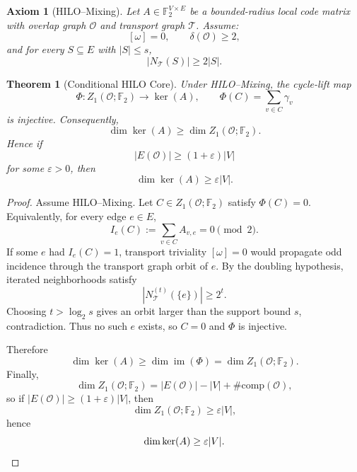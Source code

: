 \documentclass[11pt]{article}
\newtheorem{theorem}{Theorem}
\newtheorem{axiom}{Axiom}
\begin{document}
\begin{axiom}[HILO--Mixing]
Let $A\in\mathbb F_2^{V\times E}$ be a bounded-radius local code matrix with overlap graph $\mathcal O$
and transport graph $\mathcal T$.
Assume:
\[
[\omega]=0,\qquad \delta(\mathcal O)\ge 2,
\]
and for every $S\subseteq E$ with $|S|\le s$,
\[
|N_{\mathcal T}(S)|\ge 2|S|.
\]
\end{axiom}

\begin{theorem}[Conditional HILO Core]
Under HILO--Mixing, the cycle-lift map
\[
\Phi: Z_1(\mathcal O;\mathbb F_2)\to \ker(A),\qquad
\Phi(C)=\sum_{v\in C}\gamma_v
\]
is injective. Consequently,
\[
\dim \ker(A)\ge \dim Z_1(\mathcal O;\mathbb F_2).
\]
Hence if
\[
|E(\mathcal O)|\ge (1+\varepsilon)|V|
\]
for some $\varepsilon>0$, then
\[
\dim\ker(A)\ge \varepsilon |V|.
\]
\end{theorem}

\begin{proof}
Assume HILO--Mixing. Let $C\in Z_1(\mathcal O;\mathbb F_2)$ satisfy $\Phi(C)=0$.
Equivalently, for every edge $e\in E$,
\[
I_e(C):=\sum_{v\in C}A_{v,e}=0 \pmod 2.
\]
If some $e$ had $I_e(C)=1$, transport triviality $[\omega]=0$ would propagate odd incidence
through the transport graph orbit of $e$. By the doubling hypothesis, iterated neighborhoods satisfy
\[
|N_{\mathcal T}^{(t)}(\{e\})|\ge 2^t.
\]
Choosing $t>\log_2 s$ gives an orbit larger than the support bound $s$, contradiction.
Thus no such $e$ exists, so $C=0$ and $\Phi$ is injective.

Therefore
\[
\dim\ker(A)\ge \dim\operatorname{im}(\Phi)=\dim Z_1(\mathcal O;\mathbb F_2).
\]
Finally,
\[
\dim Z_1(\mathcal O;\mathbb F_2)=|E(\mathcal O)|-|V|+\#\mathrm{comp}(\mathcal O),
\]
so if $|E(\mathcal O)|\ge (1+\varepsilon)|V|$, then
\[
\dim Z_1(\mathcal O;\mathbb F_2)\ge \varepsilon |V|,
\]
hence
\[
\dim\ker(A)\ge \varepsilon |V|.
\qedhere
\]
\end{proof}
\end{document}
